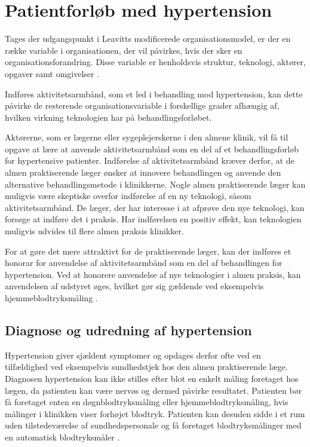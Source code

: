 \section{Patientforløb med hypertension}
Tages der udgangspunkt i Leavitts modificerede organisationsmodel, er der en række variable i organisationen, der vil påvirkes, hvis der sker en organisationsforandring. Disse variable er henholdsvis struktur, teknologi, aktører, opgaver samt omgivelser \citep{mtvhaandbog}.

Indføres aktivitetsarmbånd, som et led i behandling mod hypertension, kan dette påvirke de resterende organisationsvariable i forskellige grader afhængig af, hvilken virkning teknologien har på behandlingsforløbet.

Aktørerne, som er lægerne eller sygeplejerskerne i den almene klinik, vil få til opgave at lære at anvende aktivitetsarmbånd som en del af et behandlingsforløb for hypertensive patienter. Indførelse af aktivitetsarmbånd kræver derfor, at de almen praktiserende læger ønsker at innovere behandlingen og anvende den alternative behandlingsmetode i klinikkerne. Nogle almen praktiserende læger kan muligvis være skeptiske overfor indførelse af en ny teknologi, såsom aktivitetsarmbånd. De læger, der har interesse i at afprøve den nye teknologi, kan forsøge at indføre det i praksis. Har indførelsen en positiv effekt, kan teknologien muligvis udvides til flere almen praksis klinikker.

For at gøre det mere attraktivt for de praktiserende læger, kan der indføres et honorar for anvendelse af aktivitetsarmbånd som en del af behandlingen for hypertension. Ved at honorere anvendelse af nye teknologier i almen praksis, kan anvendelsen af udstyret øges, hvilket gør sig gældende ved eksempelvis hjemmeblodtryksmåling \citep{bang2006}.

\subsection{Diagnose og udredning af hypertension}

Hypertension giver sjældent symptomer og opdages derfor ofte ved en tilfældighed ved eksempelvis sundhedstjek hos den almen praktiserende læge. Diagnosen hypertension kan ikke stilles efter blot en enkelt måling foretaget hos lægen, da patienten kan være nervøs og dermed påvirke resultatet. Patienten bør få foretaget enten en døgnblodtryksmåling eller hjemmeblodtryksmåling, hvis målinger i klinikken viser forhøjet blodtryk. Patienten kan desuden sidde i et rum uden tilstedeværelse af sundhedspersonale og få foretaget blodtryksmålinger med en automatisk blodtryksmåler \citep{lodberg2016, bech2015}.

